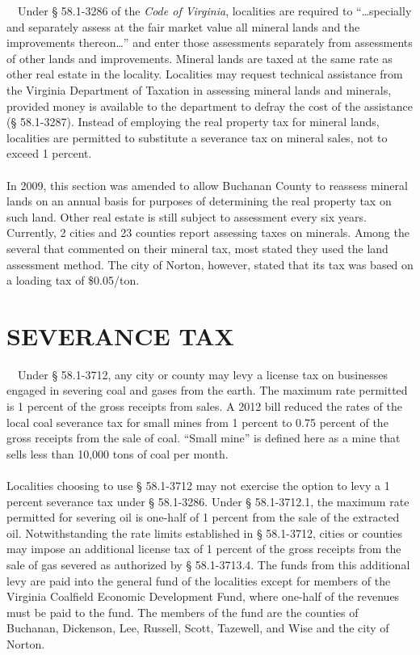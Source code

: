 \documentclass[
]{book}
\begin{document}
~~Under § 58.1-3286 of the \emph{Code of Virginia}, localities are required to ``\ldots specially and separately assess at the fair market value all mineral lands and the improvements thereon\ldots{}'' and enter those assessments separately from assessments of other lands and improvements. Mineral lands are taxed at the same rate as other real estate in the locality. Localities may request technical assistance from the Virginia Department of Taxation in assessing mineral lands and minerals, provided money is available to the department to defray the cost of the assistance (§ 58.1-3287). Instead of employing the real property tax for mineral lands, localities are permitted to substitute a severance tax on mineral sales, not to exceed 1 percent.\\
~\\
\hspace*{0.333em}\hspace*{0.333em}In 2009, this section was amended to allow Buchanan County to reassess mineral lands on an annual basis for purposes of determining the real property tax on such land. Other real estate is still subject to assessment every six years. Currently, 2 cities and 23 counties report assessing taxes on minerals. Among the several that commented on their mineral tax, most stated they used the land assessment method. The city of Norton, however, stated that its tax was based on a loading tax of \$0.05/ton.\\

\hypertarget{severance-tax}{%
\section{SEVERANCE TAX}\label{severance-tax}}

~~Under § 58.1-3712, any city or county may levy a license tax on businesses engaged in severing coal and gases from the earth. The maximum rate permitted is 1 percent of the gross receipts from sales. A 2012 bill reduced the rates of the local coal severance tax for small mines from 1 percent to 0.75 percent of the gross receipts from the sale of coal. ``Small mine'' is defined here as a mine that sells less than 10,000 tons of coal per month.\\
~\\
\hspace*{0.333em}\hspace*{0.333em}Localities choosing to use § 58.1-3712 may not exercise the option to levy a 1 percent severance tax under § 58.1-3286. Under § 58.1-3712.1, the maximum rate permitted for severing oil is one-half of 1 percent from the sale of the extracted oil. Notwithstanding the rate limits established in § 58.1-3712, cities or counties may impose an additional license tax of 1 percent of the gross receipts from the sale of gas severed as authorized by § 58.1-3713.4. The funds from this additional levy are paid into the general fund of the localities except for members of the Virginia Coalfield Economic Development Fund, where one-half of the revenues must be paid to the fund. The members of the fund are the counties of Buchanan, Dickenson, Lee, Russell, Scott, Tazewell, and Wise and the city of Norton.\\
\end{document}
